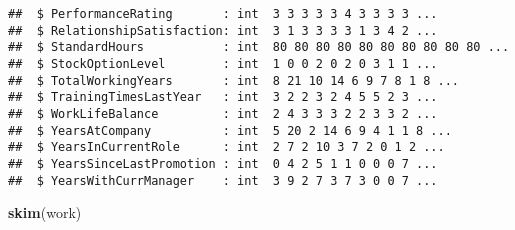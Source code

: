 \documentclass[]{article}
\newenvironment{Shaded}{\begin{snugshade}}{\end{snugshade}}
\newcommand{\KeywordTok}[1]{\textcolor[rgb]{0.13,0.29,0.53}{\textbf{#1}}}
\newcommand{\NormalTok}[1]{#1}
\begin{document}
\begin{verbatim}
##  $ PerformanceRating       : int  3 3 3 3 3 4 3 3 3 3 ...
##  $ RelationshipSatisfaction: int  3 1 3 3 3 3 1 3 4 2 ...
##  $ StandardHours           : int  80 80 80 80 80 80 80 80 80 80 ...
##  $ StockOptionLevel        : int  1 0 0 2 0 2 0 3 1 1 ...
##  $ TotalWorkingYears       : int  8 21 10 14 6 9 7 8 1 8 ...
##  $ TrainingTimesLastYear   : int  3 2 2 3 2 4 5 5 2 3 ...
##  $ WorkLifeBalance         : int  2 4 3 3 3 2 2 3 3 2 ...
##  $ YearsAtCompany          : int  5 20 2 14 6 9 4 1 1 8 ...
##  $ YearsInCurrentRole      : int  2 7 2 10 3 7 2 0 1 2 ...
##  $ YearsSinceLastPromotion : int  0 4 2 5 1 1 0 0 0 7 ...
##  $ YearsWithCurrManager    : int  3 9 2 7 3 7 3 0 0 7 ...
\end{verbatim}

\begin{Shaded}
\begin{Highlighting}[]
\KeywordTok{skim}\NormalTok{(work)}
\end{Highlighting}
\end{Shaded}
\end{document}
